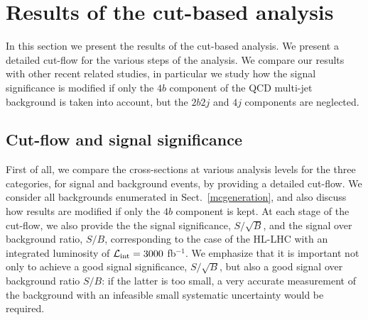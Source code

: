 
\section{Results of the cut-based analysis}

\label{sec:results}

In this section we present the results of the 
cut-based analysis.
%
We present a detailed cut-flow for the various steps
of the analysis.
%
We
compare our results with other recent related studies, in particular
we study how the signal significance
is modified if only the $4b$ component of the
QCD multi-jet background is taken into account,
but the $2b2j$ and $4j$ components are neglected.
%


\subsection{Cut-flow and signal significance}

First of all, we compare the cross-sections at various
analysis levels for the three categories, for signal and background events,
by providing a detailed cut-flow.
%
We consider all backgrounds enumerated in Sect.~\ref{mcgeneration},
and also discuss how results are modified if only the $4b$
component is kept.
%
At each stage of the cut-flow, we also provide the
the signal significance, $S/\sqrt{B}$, and the signal
over background ratio, $S/B$, corresponding to the case of the
 HL-LHC with
an integrated luminosity of $\mathcal{L}_{\rm int}
=3000$ fb$^{-1}$.
%
We emphasize that it is important not only to achieve a good signal
significance, $S/\sqrt{B}$, but also a good signal over background ratio $S/B$:
if the latter is too small, a very accurate
measurement of the background with an infeasible small
systematic uncertainty would be required.


   

